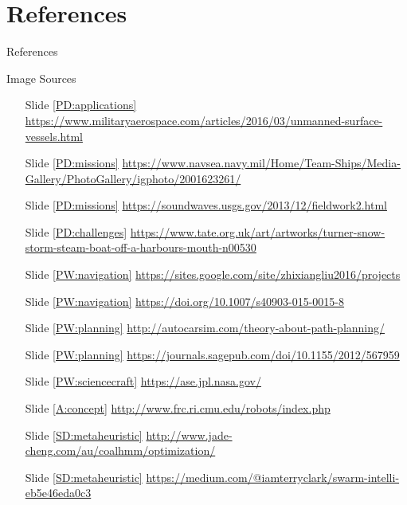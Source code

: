 \documentclass[9pt]{beamer}
\begin{document}
\section{References}
\begin{frame}{References}
    \begin{alertblock}{Image Sources}
        \begin{itemize}

\item [Slide \ref{PD:applications}]  \url{https://www.militaryaerospace.com/articles/2016/03/unmanned-surface-vessels.html} 
\item [Slide \ref{PD:missions}]      \url{https://www.navsea.navy.mil/Home/Team-Ships/Media-Gallery/PhotoGallery/igphoto/2001623261/}
\item [Slide \ref{PD:missions}]      \url{https://soundwaves.usgs.gov/2013/12/fieldwork2.html}
\item [Slide \ref{PD:challenges}]    \url{https://www.tate.org.uk/art/artworks/turner-snow-storm-steam-boat-off-a-harbours-mouth-n00530}

\item [Slide \ref{PW:navigation}]    \url{https://sites.google.com/site/zhixiangliu2016/projects}
\item [Slide \ref{PW:navigation}]    \url{https://doi.org/10.1007/s40903-015-0015-8}
\item [Slide \ref{PW:planning}]      \url{http://autocarsim.com/theory-about-path-planning/}
\item [Slide \ref{PW:planning}]      \url{https://journals.sagepub.com/doi/10.1155/2012/567959}
\item [Slide \ref{PW:sciencecraft}]  \url{https://ase.jpl.nasa.gov/}

\item [Slide \ref{A:concept}]        \url{http://www.frc.ri.cmu.edu/robots/index.php}

\item [Slide \ref{SD:metaheuristic}] \url{http://www.jade-cheng.com/au/coalhmm/optimization/}
\item [Slide \ref{SD:metaheuristic}] \url{https://medium.com/@iamterryclark/swarm-intelli-eb5e46eda0c3}

        \end{itemize}
    \end{alertblock}
\end{frame}
\end{document}
